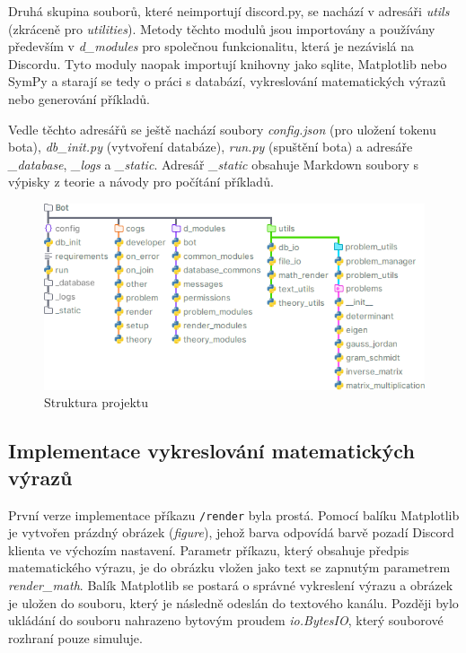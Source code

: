 \documentclass[FM]{tulthesis}
\begin{document}
	Druhá skupina souborů, které neimportují discord.py, se nachází v adresáři \textit{utils} (zkráceně pro \textit{utilities}). Metody těchto modulů jsou importovány a používány především v \textit{d\_modules} pro společnou funkcionalitu, která je nezávislá na Discordu. Tyto moduly naopak importují knihovny jako sqlite, Matplotlib nebo SymPy a starají se tedy o práci s databází, vykreslování matematických výrazů nebo generování příkladů. %
	
	Vedle těchto adresářů se ještě nachází soubory \textit{config.json} (pro uložení tokenu bota), \textit{db\_init.py} (vytvoření databáze), \textit{run.py} (spuštění bota) a adresáře \textit{\_database}, \textit{\_logs} a \textit{\_static}. Adresář \textit{\_static} obsahuje Markdown soubory s výpisky z teorie a návody pro počítání příkladů. %
	
	\begin{figure}[ht]
		\centering
		\includegraphics[width=\textwidth]{img/ProjectStructure}
		\caption{Struktura projektu}
	\end{figure}

	\subsection{Implementace vykreslování matematických výrazů}

	První verze implementace příkazu \verb*|/render| byla prostá. Pomocí balíku Matplotlib je vytvořen prázdný obrázek (\textit{figure}), jehož barva odpovídá barvě pozadí Discord klienta ve výchozím nastavení. Parametr příkazu, který obsahuje předpis matematického výrazu, je do obrázku vložen jako text se zapnutým parametrem \textit{render\_math}. Balík Matplotlib se postará o správné vykreslení výrazu a obrázek je uložen do souboru, který je následně odeslán do textového kanálu. Později bylo ukládání do souboru nahrazeno bytovým proudem \textit{io.BytesIO}, který souborové rozhraní pouze simuluje.
\end{document}
